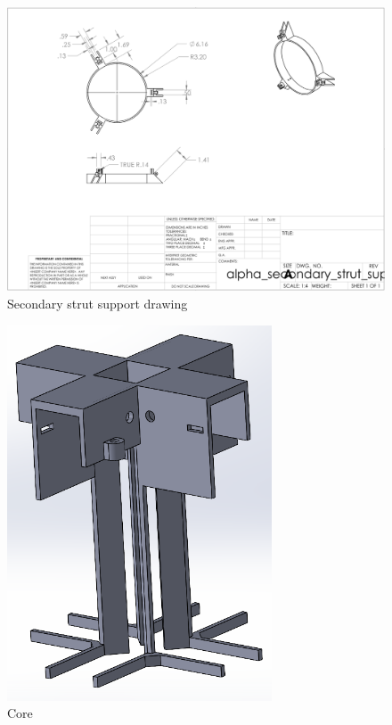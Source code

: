 \begin{figure}[H]
    \centering
    \includegraphics[width=\textwidth]{src/figs/cad-and-dwgs/secondary_strut_dwg.png}
    \caption{Secondary strut support drawing}
    \label{cad:secondary-strut-support:dwg}
\end{figure}

\begin{figure}[H]
    \centering
    \includegraphics[width=0.7\textwidth]{src/figs/cad-and-dwgs/core-cad.png}
    \caption{Core}
    \label{cad:core}
\end{figure}

